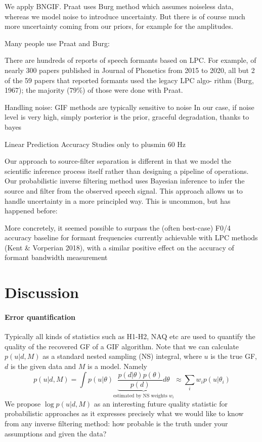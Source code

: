 \begin{chaptersections}{%
We apply BNGIF.
}
Praat uses Burg method which assumes noiseless data, whereas we model noise to introduce uncertainty.
But there is of course much more uncertainty coming from our priors, for example for the amplitudes.

Many people use Praat and Burg:

There are hundreds of reports of speech formants based
on LPC. For example, of nearly 300 papers published in
Journal of Phonetics from 2015 to 2020, all but 2 of the 59
papers that reported formants used the legacy LPC algo-
rithm (Burg, 1967); the majority (79\%) of those were done
with Praat. \citep{Whalen2022}

Handling noise: GIF methods are typically sensitive to noise \citep{Drugman2019}
In our case, if noise level is very high, simply posterior is the prior, graceful degradation, thanks to bayes

Linear Prediction Accuracy Studies \citep[][p.~181]{Fulop2011} only to plusmin 60 Hz

Our approach to source-filter separation is different in that we model the scientific inference process itself rather than designing a pipeline of operations. Our probabilistic inverse filtering method uses Bayesian inference to infer the source and filter from the observed speech signal. This approach allows us to handle uncertainty in a more principled way.
This is uncommon, but has happened before: \citep{Auvinen2014}

More concretely, it seemed
possible to surpass the (often best-case) F0/4 accuracy baseline for formant frequencies
currently achievable with LPC methods (Kent \& Vorperian 2018), with a similar positive
effect on the accuracy of formant bandwidth measurement

\section{Discussion}

\paragraph{Error quantification}
Typically all kinds of statistics such as H1-H2, NAQ etc are used to quantify the quality of the recovered GF of a GIF algorithm.
Note that we can calculate $p(u|d,M)$ as a standard nested sampling (NS) integral, where $u$ is the true GF, $d$ is the given data and $M$ is a model.
Namely
\begin{equation}
	p(u|d,M) = \int p(u|\theta) \underbrace{\frac{p(d|\theta) p(\theta)}{p(d)}d\theta}_\text{estimated by NS weights $w_i$} \approx \sum_i w_i p(u|\theta_i)
\end{equation}
We propose $\log p(u|d,M)$ as an interesting future quality statistic for probabilistic approaches as it expresses precisely what we would like to know from any inverse filtering method: how probable is the truth under your assumptions and given the data?


\end{chaptersections}

